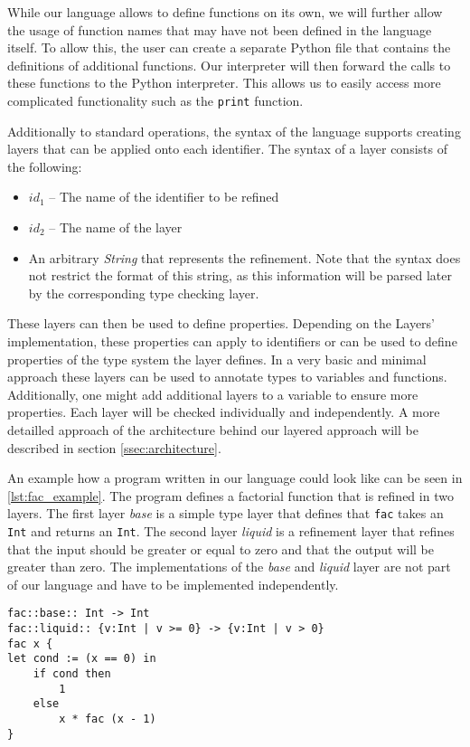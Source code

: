While our language allows to define functions on its own, we will further allow the usage of function names that may have not been defined in the language itself. To allow this, the user can create a separate Python file that contains the definitions of additional functions. Our interpreter will then forward the calls to these functions to the Python interpreter. This allows us to easily access more complicated functionality such as the \texttt{print} function.

Additionally to standard operations, the syntax of the language supports creating layers that can be applied onto each identifier. The syntax of a layer consists of the following:
\begin{itemize}
	\item $id_1$ -- The name of the identifier to be refined
	\item $id_2$ -- The name of the layer
	\item An arbitrary \textit{String} that represents the refinement. Note that the syntax does not restrict the format of this string, as this information will be parsed later by the corresponding type checking layer.
\end{itemize}

These layers can then be used to define properties. Depending on the Layers' implementation, these properties can apply to identifiers or can be used to define properties of the type system the layer defines. In a very basic and minimal approach these layers can be used to annotate types to variables and functions. Additionally, one might add additional layers to a variable to ensure more properties. Each layer will be checked individually and independently. A more detailled approach of the architecture behind our layered approach will be described in section \ref{ssec:architecture}.

An example how a program written in our language could look like can be seen in \ref{lst:fac_example}. The program defines a factorial function that is refined in two layers. The first layer \textit{base} is a simple type layer that defines that \texttt{fac} takes an \texttt{Int} and returns an \texttt{Int}. The second layer \textit{liquid} is a refinement layer that refines that the input should be greater or equal to zero and that the output will be greater than zero. The implementations of the \textit{base} and \textit{liquid} layer are not part of our language and have to be implemented independently.

\begin{lstlisting}[caption={Example of a factorial function in our simple language}, label={lst:fac_example}]
fac::base:: Int -> Int
fac::liquid:: {v:Int | v >= 0} -> {v:Int | v > 0}
fac x { 
let cond := (x == 0) in
	if cond then 
		1 
	else 
		x * fac (x - 1) 
}
\end{lstlisting}


